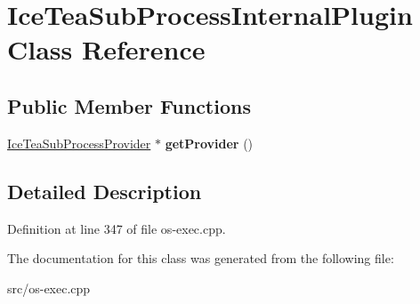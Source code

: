 \hypertarget{class_ice_tea_sub_process_internal_plugin}{}\section{Ice\+Tea\+Sub\+Process\+Internal\+Plugin Class Reference}
\label{class_ice_tea_sub_process_internal_plugin}
\subsection*{Public Member Functions}
\begin{DoxyCompactItemize}
\item 
\hyperlink{class_ice_tea_sub_process_provider}{Ice\+Tea\+Sub\+Process\+Provider} $\ast$ {\bfseries get\+Provider} ()\hypertarget{class_ice_tea_sub_process_internal_plugin_a7a75bdd80a85521128676aa92980adaf}{}\label{class_ice_tea_sub_process_internal_plugin_a7a75bdd80a85521128676aa92980adaf}

\end{DoxyCompactItemize}


\subsection{Detailed Description}


Definition at line 347 of file os-\/exec.\+cpp.



The documentation for this class was generated from the following file\+:\begin{DoxyCompactItemize}
\item 
src/os-\/exec.\+cpp\end{DoxyCompactItemize}
